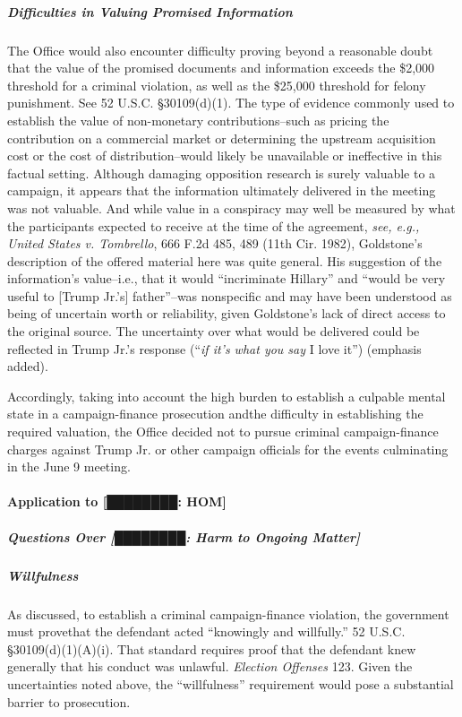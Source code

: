 \subparagraph{Difficulties in Valuing Promised Information}
The Office would also encounter difficulty proving beyond a reasonable doubt that the value of the promised documents and information exceeds the \$2,000 threshold for a criminal violation, as well as the \$25,000 threshold for felony punishment. 
See 52 U.S.C. \S 30109(d)(1). 
The type of evidence commonly used to establish the value of non-monetary contributions--such as pricing the contribution on a commercial market or determining the upstream acquisition cost or the cost of distribution--would likely be unavailable or ineffective in this factual setting. 
Although damaging opposition research is surely valuable to a campaign, it appears that the information ultimately delivered in the meeting was not valuable. 
And while value in a conspiracy may well be measured by what the participants expected to receive at the time of the agreement, \textit{see, e.g., United States v. Tombrello}, 666 F.2d 485, 489 (11th Cir. 1982), Goldstone's description of the offered material here was quite general. 
His suggestion of the information's value--i.e., that it would ``incriminate Hillary'' and ``would be very useful to [Trump Jr.'s] father''--was nonspecific and may have been understood as being of uncertain worth or reliability, given Goldstone's lack of direct access to the original source. 
The uncertainty over what would be delivered could be reflected in Trump Jr.'s response (``\textit{if it's what you say} I love it'') (emphasis added). 

Accordingly, taking into account the high burden to establish a culpable mental state in a campaign-finance prosecution andthe difficulty in establishing the required valuation, the Office decided not to pursue criminal campaign-finance charges against Trump Jr. or other campaign officials for the events culminating in the June 9 meeting.

\paragraph{Application to [████████: HOM]}

\subparagraph{Questions Over [████████: Harm to Ongoing Matter]}


\subparagraph{Willfulness}
As discussed, to establish a criminal campaign-finance violation, the government must provethat the defendant acted ``knowingly and willfully.'' 
52 U.S.C. \S 30109(d)(1)(A)(i). 
That standard requires proof that the defendant knew generally that his conduct was unlawful. 
\textit{Election Offenses} 123. 
Given the uncertainties noted above, the ``willfulness'' requirement would pose a substantial barrier to prosecution.

